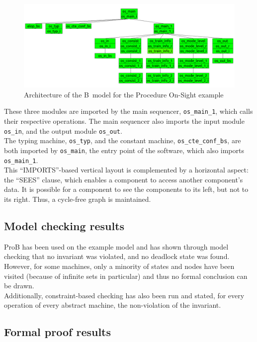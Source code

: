 \documentclass{article}
\begin{document}
\begin{figure}[h!]
\centering
\includegraphics[width=1\textwidth]{procedureos}
\caption{Architecture of the B~model for the Procedure On-Sight example}
\label{fig:procos}
\end{figure}

These three modules are imported by the main sequencer, \verb+os_main_1+, which calls their respective operations. The main sequencer also imports the input module \verb+os_in+, and the output module \verb+os_out+.\\
The typing machine, \verb+os_typ+, and the constant machine, \verb+os_cte_conf_bs+, are both imported by \verb+os_main+, the entry point of the software, which also imports \verb+os_main_1+.\\
 
This ``IMPORTS''-based vertical layout is complemented by a horizontal aspect: the ``SEES'' clause, which enables a component to access another component's data. It is possible for a component to see the components to its left, but not to its right. Thus, a cycle-free graph is maintained.
 
\subsection{Model checking results}
\label{subapp:mc}
ProB has been used on the example model and has shown through model checking that no invariant was violated, and no deadlock state was found. However, for some machines, only a minority of states and nodes have been visited (because of infinite sets in particular) and thus no formal conclusion can be drawn.\\
Additionally, constraint-based checking has also been run and stated, for every operation of every abstract machine, the non-violation of the invariant.

\subsection{Formal proof results}
\label{subapp:proof}
\end{document}
